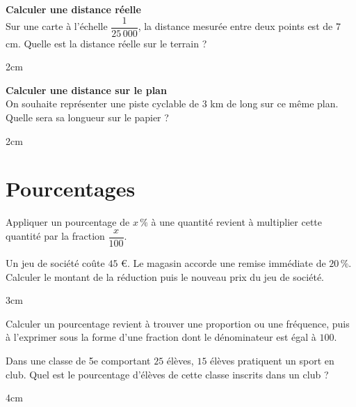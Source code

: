\documentclass[a4paper]{book}
\begin{document}
    \begin{exemple}
        \textbf{Calculer une distance réelle} \\[0.1cm]
        Sur une carte à l'échelle $\dfrac{1}{25\,000}$, la distance mesurée entre deux points est de $7$ cm. Quelle est la distance réelle sur le terrain ?
        \begin{ZoneReponse}{2cm}
        \end{ZoneReponse}
    \end{exemple}

\newpage
    
    \begin{exemple}
        \textbf{Calculer une distance sur le plan} \\[0.1cm]
        On souhaite représenter une piste cyclable de $3$ km de long sur ce même plan. Quelle sera sa longueur sur le papier ?
        \begin{ZoneReponse}{2cm}
        \end{ZoneReponse}
    \end{exemple}


\section{Pourcentages}
    \begin{propriete}
        Appliquer un pourcentage de $x\,\%$ à une quantité revient à multiplier cette quantité par la fraction $\dfrac{x}{100}$.
    \end{propriete}

    \begin{exemple}
        Un jeu de société coûte $45$ \euro. Le magasin accorde une remise immédiate de $20\,\%$. Calculer le montant de la réduction puis le nouveau prix du jeu de société.
        
        \begin{ZoneReponse}{3cm}
        \end{ZoneReponse}
    \end{exemple}

    \begin{propriete}
        Calculer un pourcentage revient à trouver une proportion ou une fréquence, puis à l'exprimer sous la forme d'une fraction dont le dénominateur est égal à $100$.
    \end{propriete}
    
    \begin{exemple}
        Dans une classe de 5e comportant $25$ élèves, $15$ élèves pratiquent un sport en club. Quel est le pourcentage d'élèves de cette classe inscrits dans un club ?
        \begin{ZoneReponse}{4cm}
        \end{ZoneReponse}
    \end{exemple}
\end{document}
